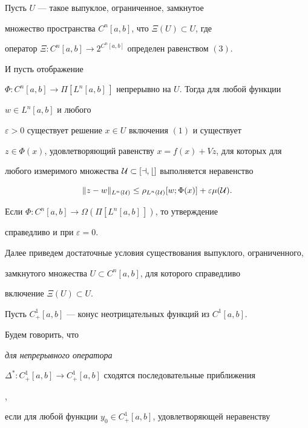 \begin{thm}


Пусть $U$ --- такое выпуклое, ограниченное, замкнутое


множество пространства $C^n[a,b]$, что $\Xi(U)\subset U$, где


оператор $\Xi:C^n[a,b]\to 2^{C^n[a,b]}$ определен равенством $(3)$.


И пусть отображение


$\Phi:C^n[a,b]\to\Pi[L^n[a,b]\,]$ непрерывно на $U$. Тогда для любой функции


$w\in L^n[a,b]$ и любого


$\varepsilon>0$ существует решение $x\in U$ включения $(1)$ и существует


$z\in\Phi(x)$, удовлетворяющий равенству $x=f(x)+Vz$, для которых для


любого измеримого множества $\cal U\subset[a,b]$ выполняется неравенство


\begin{equation}


\|z-w\|_{L^n(\cal U)}\le\rho_{L^n(\cal U)}[w;\Phi(x)]+


\varepsilon\mu(\cal U).


\end{equation}


Если $\Phi:C^n[a,b]\to\Omega(\Pi[L^n[a,b]\,])$, то утверждение


справедливо и при $\varepsilon=0$.


\end{thm}





Далее приведем достаточные условия существования выпуклого, ограниченного,


замкнутого множества $U\subset C^n[a,b]$, для которого справедливо


включение $\Xi(U)\subset U$.





Пусть $C^1_+[a,b]$ --- конус неотрицательных функций из $C^1[a,b]$.





Будем говорить, что {\it для непрерывного оператора


$\Delta^*:C^1_+[a,b]\to C^1_+[a,b]$ сходятся последовательные приближения},


если для любой функции $y_0\in C^1_+[a,b]$, удовлетворяющей неравенству


